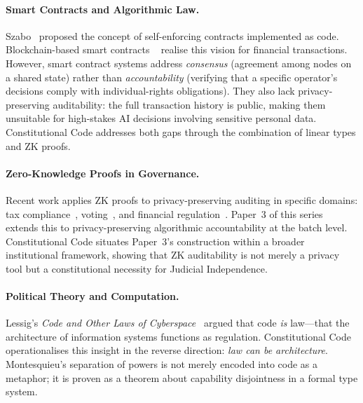 \paragraph{Smart Contracts and Algorithmic Law.}
Szabo~\cite{szabo1997} proposed the concept of self-enforcing
contracts implemented as code. Blockchain-based smart contracts
~\cite{buterin2014} realise this vision for financial transactions.
However, smart contract systems address \emph{consensus}
(agreement among nodes on a shared state) rather than
\emph{accountability} (verifying that a specific operator's
decisions comply with individual-rights obligations). They also
lack privacy-preserving auditability: the full transaction history
is public, making them unsuitable for high-stakes AI decisions
involving sensitive personal data. Constitutional Code addresses
both gaps through the combination of linear types and ZK proofs.

\paragraph{Zero-Knowledge Proofs in Governance.}
Recent work applies ZK proofs to privacy-preserving auditing in
specific domains: tax compliance~\cite{bunz2018bulletproofs},
voting~\cite{benaloh1994receipt}, and financial
regulation~\cite{zkledger2018}. Paper~3 of this series~\cite{btv-ar2026}
extends this to privacy-preserving algorithmic accountability at
the batch level. Constitutional Code situates Paper~3's construction
within a broader institutional framework, showing that ZK
auditability is not merely a privacy tool but a constitutional
necessity for Judicial Independence.

\paragraph{Political Theory and Computation.}
Lessig's \emph{Code and Other Laws of Cyberspace}~\cite{lessig1999}
argued that code \emph{is} law---that the architecture of information
systems functions as regulation. Constitutional Code operationalises
this insight in the reverse direction: \emph{law can be architecture}.
Montesquieu's separation of powers is not merely encoded into code as
a metaphor; it is proven as a theorem about capability disjointness
in a formal type system.

